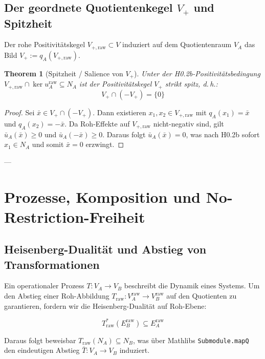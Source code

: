 \documentclass[11pt,a4paper]{article}
\newtheorem{theorem}{Theorem}[section]
\begin{document}
\subsection{Der geordnete Quotientenkegel $V_+$ und Spitzheit}

Der rohe Positivitätskegel $V_{+,\text{raw}} \subset V$ induziert auf dem Quotientenraum $V_A$ das Bild $V_+ := q_A(V_{+,\text{raw}})$. 

\begin{theorem}[Spitzheit / Salience von $V_+$]
Unter der H0.2b-Positivitätsbedingung $V_{+,\text{raw}} \cap \ker u_A^{\text{raw}} \subseteq N_A$ ist der Positivitätskegel $V_+$ strikt spitz, d.\,h.:
\begin{equation}
V_+ \cap (-V_+) = \{0\}
\end{equation}
\end{theorem}

\begin{proof}
Sei $\bar{x} \in V_+ \cap (-V_+)$. Dann existieren $x_1, x_2 \in V_{+,\text{raw}}$ mit $q_A(x_1) = \bar{x}$ und $q_A(x_2) = -\bar{x}$. Da Roh-Effekte auf $V_{+,\text{raw}}$ nicht-negativ sind, gilt $\bar{u}_A(\bar{x}) \ge 0$ und $\bar{u}_A(-\bar{x}) \ge 0$. Daraus folgt $\bar{u}_A(\bar{x}) = 0$, was nach H0.2b sofort $x_1 \in N_A$ und somit $\bar{x} = 0$ erzwingt.
\end{proof}

---

\section{Prozesse, Komposition und No-Restriction-Freiheit}

\subsection{Heisenberg-Dualität und Abstieg von Transformationen}

Ein operationaler Prozess $T: V_A \to V_B$ beschreibt die Dynamik eines Systems. Um den Abstieg einer Roh-Abbildung $T_{\text{raw}}: V_A^{\text{raw}} \to V_B^{\text{raw}}$ auf den Quotienten zu garantieren, fordern wir die Heisenberg-Dualität auf Roh-Ebene:

\begin{equation}
T_{\text{raw}}^*(E_B^{\text{raw}}) \subseteq E_A^{\text{raw}}
\end{equation}

Daraus folgt beweisbar $T_{\text{raw}}(N_A) \subseteq N_B$, was über Mathlibs \texttt{Submodule.mapQ} den eindeutigen Abstieg $\bar{T}: V_A \to V_B$ induziert.
\end{document}
